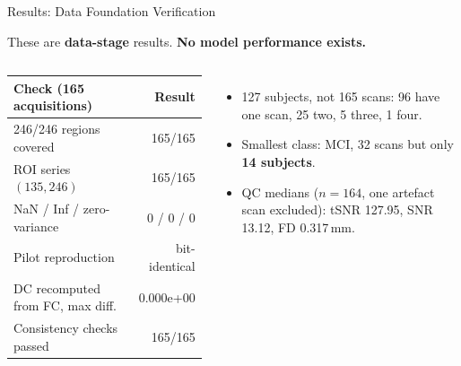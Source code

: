 \documentclass[aspectratio=169,11pt]{beamer}
\begin{document}
\begin{frame}{Results: Data Foundation Verification}
  \begin{alertblock}{}
    \small These are \textbf{data-stage} results. \textbf{No model performance exists.}
  \end{alertblock}
  \vspace{0.1cm}
  \begin{columns}[T,onlytextwidth]
      \small
      \begin{tabular}{lr}
        \toprule
        \textbf{Check (165 acquisitions)} & \textbf{Result} \\
        \midrule
        246/246 regions covered & 165/165 \\
        ROI series $(135,246)$ & 165/165 \\
        NaN / Inf / zero-variance & 0 / 0 / 0 \\
        Pilot reproduction & bit-identical \\
        DC recomputed from FC, max diff. & \alert{0.000e+00} \\
        Consistency checks passed & 165/165 \\
        \bottomrule
      \end{tabular}
      \small
      \begin{itemize}
        \item \alert{127 subjects, not 165 scans}: 96 have one scan, 25 two, 5 three, 1 four.
        \item Smallest class: MCI, 32 scans but only \textbf{14 subjects}.
        \item QC medians ($n=164$, one artefact scan excluded): tSNR 127.95, SNR 13.12, FD 0.317\,mm.
      \end{itemize}
  \end{columns}
\end{frame}
\end{document}
